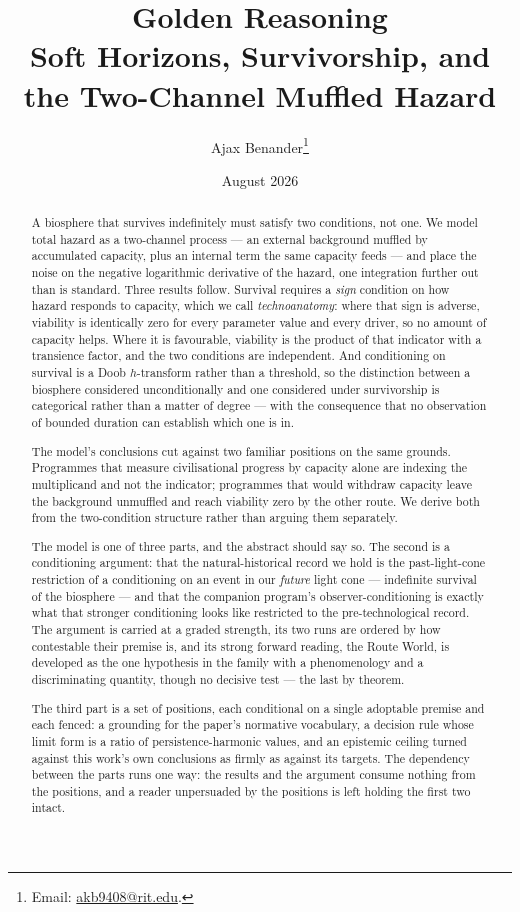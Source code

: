 \documentclass[11pt]{article}
\title{Golden Reasoning\\[4pt]
\large Soft Horizons, Survivorship, and the Two-Channel Muffled Hazard}
\author{Ajax Benander\thanks{Email: \href{mailto:akb9408@rit.edu}{akb9408@rit.edu}.}}
\date{August 2026}
\numberwithin{equation}{section}
\theoremstyle{plain}
\theoremstyle{definition}
\theoremstyle{remark}
\begin{document}
\maketitle

\begin{abstract}\small
\noindent A biosphere that survives indefinitely must satisfy two
conditions, not one. We model total hazard as a two-channel process ---
an external background muffled by accumulated capacity, plus an internal
term the same capacity feeds --- and place the noise on the negative
logarithmic derivative of the hazard, one integration further out than
is standard. Three results follow. Survival requires a \emph{sign}
condition on how hazard responds to capacity, which we call
\emph{technoanatomy}: where that sign is adverse, viability is
identically zero for every parameter value and every driver, so no
amount of capacity helps. Where it is favourable, viability is the
product of that indicator with a transience factor, and the two
conditions are independent. And conditioning on survival is a Doob
$h$-transform rather than a threshold, so the distinction between a
biosphere considered unconditionally and one considered under
survivorship is categorical rather than a matter of degree --- with the
consequence that no observation of bounded duration can establish which
one is in.

The model's conclusions cut against two familiar positions on the same
grounds. Programmes that measure civilisational progress by capacity
alone are indexing the multiplicand and not the indicator; programmes
that would withdraw capacity leave the background unmuffled and reach
viability zero by the other route. We derive both from the two-condition
structure rather than arguing them separately.

The model is one of three parts, and the abstract should say so. The
second is a conditioning argument: that the natural-historical record we
hold is the past-light-cone restriction of a conditioning on an event in
our \emph{future} light cone --- indefinite survival of the biosphere ---
and that the companion program's observer-conditioning is exactly what
that stronger conditioning looks like restricted to the pre-technological
record. The argument is carried at a graded strength, its two runs are
ordered by how contestable their premise is, and its strong forward
reading, the Route World, is developed as the one hypothesis in the
family with a phenomenology and a discriminating quantity, though no
decisive test --- the last by theorem.

The third part is a set of positions, each conditional on a single
adoptable premise and each fenced: a grounding for the paper's normative
vocabulary, a decision rule whose limit form is a ratio of
persistence-harmonic values, and an epistemic ceiling turned against this
work's own conclusions as firmly as against its targets. The dependency
between the parts runs one way: the results and the argument consume
nothing from the positions, and a reader unpersuaded by the positions is
left holding the first two intact.
\end{abstract}
\end{document}
